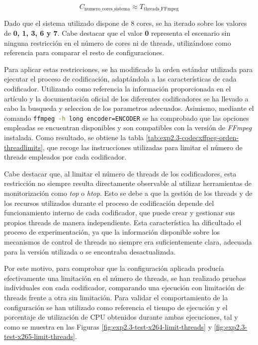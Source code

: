 \[C_{\text{numero\_cores\_sistema}} \approx T_{\text{threads\_FFmpeg}}\]

Dado que el sistema utilizado dispone de 8 cores, se ha iterado sobre los valores de \textbf{0, 1, 3, 6 y 7}. Cabe destacar que el valor \textbf{0} representa el escenario sin ninguna restricción en el número de cores ni de threads, utilizándose como referencia para comparar el resto de configuraciones.

Para aplicar estas restricciones, se ha modificado la orden estándar utilizada para ejecutar el proceso de codificación, adaptándola a las características de cada codificador. Utilizando como referencia la información proporcionada en el artículo \cite{threads-number-encoding} y la documentación oficial de los diferentes codificadores \cite{ffmpeg-oficial-documentation} \cite{x265-documentation-threading} se ha llevado a cabo la busqueda y seleccion de los parametros adecuados. Asimismo, mediante el comando \lstinline[language=sh]{ffmpeg -h long encoder=ENCODER} se ha comprobado que las opciones empleadas se encuentran disponibles y son compatibles con la versión de \textit{FFmpeg} instalada. Como resultado, se obtiene la tabla \ref{tab:exp2.3-codecxffpeg-orden-threadlimits}, que recoge las instrucciones utilizadas para limitar el número de threads empleados por cada codificador.

Cabe destacar que, al limitar el número de threads de los codificadores, esta restricción no siempre resulta directamente observable al utilizar herramientas de monitorización como \textit{top} o \textit{htop}. Esto se debe a que la gestión de los threads y de los recursos utilizados durante el proceso de codificación depende del funcionamiento interno de cada codificador, que puede crear y gestionar sus propios threads de manera independiente. Esta característica ha dificultado el proceso de experimentación, ya que la información disponible sobre los mecanismos de control de threads no siempre era suficientemente clara, adecuada para la versión utilizada o se encontraba desactualizada.

Por este motivo, para comprobar que la configuración aplicada producía efectivamente una limitación en el número de threads, se han realizado pruebas individuales con cada codificador, comparando una ejecución con limitación de threads frente a otra sin limitación. Para validar el comportamiento de la configuración se han utilizado como referencia el tiempo de ejecución y el porcentaje de utilización de CPU obtenidos durante ambas ejecuciones, tal y como se muestra en las Figuras \ref{fig:exp2.3-test-x264-limit-threads} y \ref{fig:exp2.3-test-x265-limit-threads}.

